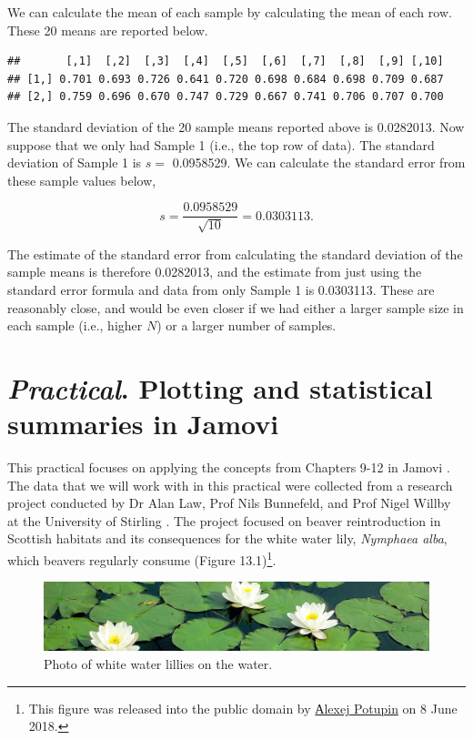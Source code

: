 \documentclass[
]{scrbook}
\begin{document}
We can calculate the mean of each sample by calculating the mean of each row.
These 20 means are reported below.

\begin{verbatim}
##       [,1]  [,2]  [,3]  [,4]  [,5]  [,6]  [,7]  [,8]  [,9] [,10]
## [1,] 0.701 0.693 0.726 0.641 0.720 0.698 0.684 0.698 0.709 0.687
## [2,] 0.759 0.696 0.670 0.747 0.729 0.667 0.741 0.706 0.707 0.700
\end{verbatim}

The standard deviation of the 20 sample means reported above is 0.0282013.
Now suppose that we only had Sample 1 (i.e., the top row of data).
The standard deviation of Sample 1 is \(s =\) 0.0958529.
We can calculate the standard error from these sample values below,

\[s = \frac{0.0958529}{\sqrt{10}} = 0.0303113.\]

The estimate of the standard error from calculating the standard deviation of the sample means is therefore 0.0282013, and the estimate from just using the standard error formula and data from only Sample 1 is 0.0303113.
These are reasonably close, and would be even closer if we had either a larger sample size in each sample (i.e., higher \(N\)) or a larger number of samples.

\hypertarget{Chapter_13}{%
\chapter{\texorpdfstring{\emph{Practical}. Plotting and statistical summaries in Jamovi}{Practical. Plotting and statistical summaries in Jamovi}}\label{Chapter_13}}

This practical focuses on applying the concepts from Chapters 9-12 in Jamovi \citep{Jamovi2022}.
The data that we will work with in this practical were collected from a research project conducted by Dr Alan Law, Prof Nils Bunnefeld, and Prof Nigel Willby at the University of Stirling \citep{Law2014}.
The project focused on beaver reintroduction in Scottish habitats and its consequences for the white water lily, \emph{Nymphaea alba}, which beavers regularly consume (Figure 13.1)\footnote{This figure was released into the public domain by \href{https://commons.wikimedia.org/wiki/File:Nymphaea_alba._Reader.jpg}{Аlexej Potupin} on 8 June 2018.}.

\begin{figure}
\includegraphics[width=1\linewidth]{img/Nymphaea_alba_pads} \caption{Photo of white water lillies on the water.}\label{fig:unnamed-chunk-46}
\end{figure}
\end{document}
